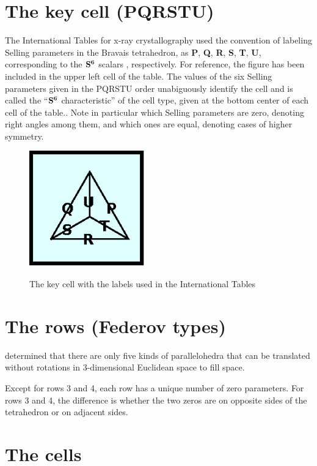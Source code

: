 \documentclass[preprint]{iucr}              %
\numberwithin{equation}{section}
\newcommand{\SVI}[0]{$\bf{S^{6}}$}
\begin{document}
\section{The key cell (PQRSTU)}

The International Tables for x-ray crystallography \cite{vonLaue1952}
used the convention of labeling Selling parameters in the Bravais
tetrahedron, as \textbf{P}, \textbf{Q}, \textbf{R}, \textbf{S}, \textbf{T}, \textbf{U}, corresponding to the \SVI{} scalars
\Svec, respectively. For reference,
the figure has been included in the upper left cell of the table.  The values of the six
Selling parameters given in the PQRSTU order unabiguously identify the cell and is called
the ``\SVI{} characteristic'' of the cell type, given at the bottom center of each cell of
the table..  Note in particular which Selling
parameters are zero, denoting right angles among them, and which ones are equal,
denoting cases of higher symmetry.
	\begin{figure}
		\includegraphics[width=5cm]{PQRSTU}
		\label{PQRSTU}
		\caption{The key cell with the labels used in the
		International Tables}
	\end{figure}
	
\section{The rows (Federov types)}
	
	 determined that there are only
	five kinds of parallelohedra that can be translated without rotations in 3-dimensional Euclidean space to fill space. 
	
	Except for rows 3 and 4, each row has a unique number of zero
	parameters. For rows 3 and 4, the difference is whether the two
	zeros are on opposite sides of the tetrahedron or on 
	adjacent sides.
	
\section{The cells}
	
\end{document}
